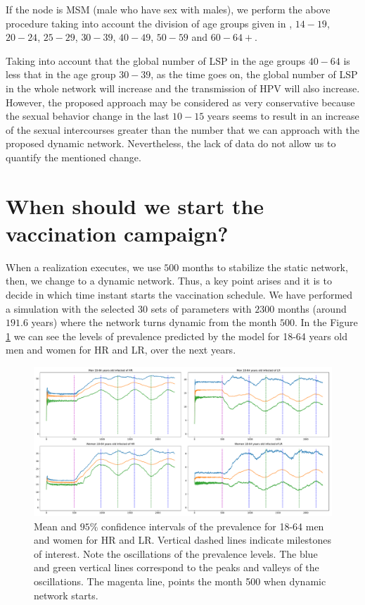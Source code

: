 If the node is MSM (male who have sex with males), we perform the above procedure taking into account the division of age groups given in \cite{Durex2002}, $14-19$, $20-24$, $25-29$, $30-39$, $40-49$, $50-59$ and $60-64+$.

Taking into account that the global number of LSP in the age groups $40-64$ is less that in the age group $30-39$, as the time goes on, the global number of LSP in the whole network will increase and the transmission of HPV will also increase. However, the proposed approach may be considered as very conservative because the sexual behavior change in the last $10-15$ years seems to result in an increase of the sexual intercourses greater than the number that we can approach with the proposed dynamic network. Nevertheless, the lack of data do not allow us to quantify the mentioned change.


\section{When should we start the vaccination campaign?} 
When a realization executes, we use $500$ months to stabilize the static network, then, we change to a dynamic network. Thus, a key point arises and it is to decide in which time instant starts the vaccination schedule. We have performed a simulation with the selected $30$ sets of parameters with $2300$ months (around $191.6$ years) where the network turns dynamic from the month $500$. In the Figure \ref{fig:Estudio_ciclos} we can see the levels of prevalence predicted by the model for 18-64 years old men and women for HR and LR, over the next years.

\begin{figure}[h!]
	\centering
	\includegraphics[width=\linewidth]{IMGs/2.-New_features/Estudio_ciclos.pdf}
	\caption{Mean and $95\%$ confidence intervals of the prevalence for 18-64 men and women for HR and LR. Vertical dashed lines indicate milestones of interest. Note the oscillations of the prevalence levels. The blue and green vertical lines correspond to the peaks and valleys of the oscillations. The magenta line, points the month 500 when dynamic network starts.}
	\label{fig:Estudio_ciclos}
\end{figure}

